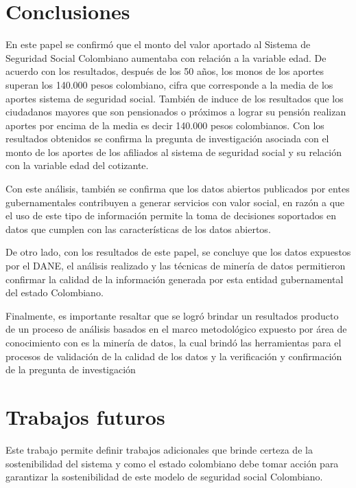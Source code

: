 \section{Conclusiones}

En este papel se confirmó que el monto del valor aportado al Sistema de Seguridad Social Colombiano aumentaba con relación a la variable edad. De acuerdo con los resultados, después de los 50 años, los monos de los aportes superan los 140.000 pesos colombiano, cifra que corresponde a la media de los aportes sistema de seguridad social. También de induce de los resultados que los ciudadanos mayores que son pensionados o próximos a lograr su pensión realizan aportes por encima de la media es decir 140.000 pesos colombianos.  Con los resultados obtenidos se confirma la pregunta de investigación asociada con el monto de los aportes de los afiliados al sistema de seguridad social y su relación con la variable edad del cotizante. 

Con este análisis, también se confirma que los datos abiertos publicados por entes gubernamentales contribuyen a generar servicios con valor social, en razón a que el uso de este tipo de información permite la toma de decisiones soportados en datos que cumplen con las características de los datos abiertos. 

De otro lado, con los resultados de este papel, se concluye que los datos expuestos por el DANE, el análisis realizado y las técnicas de minería de datos permitieron confirmar la calidad de la información generada por esta entidad gubernamental del estado Colombiano. 

Finalmente, es importante resaltar que se logró brindar un resultados producto de un proceso de análisis basados en el marco metodológico expuesto por área de conocimiento con es la minería de datos, la cual brindó las herramientas para el procesos de validación de la calidad de los datos y la verificación y confirmación de la pregunta de investigación


\section{Trabajos futuros} 


Este trabajo permite definir trabajos adicionales que brinde certeza de la sostenibilidad del sistema y como el estado colombiano debe tomar acción para garantizar la sostenibilidad de este modelo de seguridad social Colombiano. 